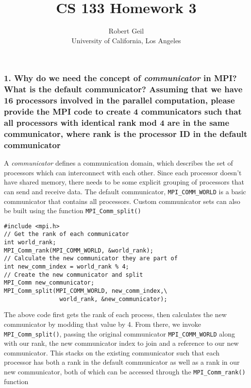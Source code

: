 \documentclass[titlepage]{article}
\title{CS 133 Homework 3}
\author{Robert Geil \\ University of California, Los Angeles}
\def\code#1{\texttt{#1}}
\begin{document}
\maketitle
\subsubsection*{1. Why do we need the concept of \textit{communicator} in MPI?
What is the default communicator? Assuming that we have 16 processors involved
in the parallel computation, please provide the MPI code to create 4
communicators such that all processors with identical rank mod 4 are in the
same communicator, where rank is the processor ID in the default communicator}
A \textit{communicator} defines a communication domain, which describes the set
of processors which can interconnect with each other. Since each processor 
doesn't have shared memory, there needs to be some explicit grouping of
processors that can send and receive data. The default communicator, 
\code{MPI\_COMM\_WORLD} is a basic communicator that contains all processors.
Custom communicator sets can also be built using the function
\code{MPI\_Comm\_split()}
\begin{verbatim}
#include <mpi.h>
// Get the rank of each communicator
int world_rank;
MPI_Comm_rank(MPI_COMM_WORLD, &world_rank);
// Calculate the new communicator they are part of
int new_comm_index = world_rank % 4;
// Create the new communicator and split
MPI_Comm new_communicator;
MPI_Comm_split(MPI_COMM_WORLD, new_comm_index,\
                world_rank, &new_communicator);
\end{verbatim}
The above code first gets the rank of each process, then calculates the new
communicator by modding that value by 4. From there, we invoke
\code{MPI\_Comm\_split()}, passing the original communicator
\code{MPI\_COMM\_WORLD} along with our rank, the new communicator index to join
and a reference to our new communicator. This stacks on the existing
communicator such that each processor has both a rank in the default
communicator as well as a rank in our new communicator, both of which can be
accessed through the \code{MPI\_Comm\_rank()} function
\end{document}

